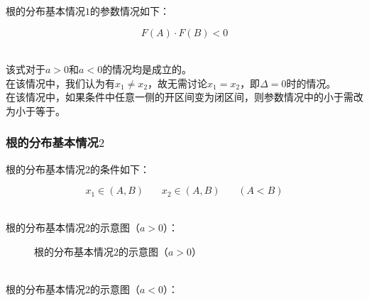 \documentclass[UTF8]{ctexart}
\begin{document}
    根的分布基本情况$1$的参数情况如下：\vspace{3pt}
    \begin{large}
        \begin{equation*}
            F(A)\cdot F(B)<0
        \end{equation*}
    \end{large}\\
    该式对于$a>0$和$a<0$的情况均是成立的。\\[3mm]
    在该情况中，我们认为有$x_1\neq x_2$，故无需讨论$x_1=x_2$，即$\Delta=0$时的情况。\\[3mm]
    在该情况中，如果条件中任意一侧的开区间变为闭区间，则参数情况中的小于需改为小于等于。

\newpage

\subsubsection{根的分布基本情况$2$}
    根的分布基本情况$2$的条件如下：
    \begin{large}
        \begin{equation*}
            x_1\in(A,B)~~~~~~~~x_2\in(A,B)~~~~~~~~(A<B)
        \end{equation*}
    \end{large}\\
    根的分布基本情况$2$的示意图（$a>0$）：\vspace{5pt}
    \begin{figure}[h]
        \begin{center}
            \caption{根的分布基本情况$2$的示意图（$a>0$）}
        \end{center}
    \end{figure}\\
    根的分布基本情况$2$的示意图（$a<0$）：\vspace{5pt}
\end{document}
